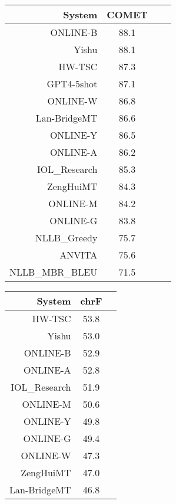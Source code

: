 \documentclass[11pt]{article}
\begin{document}
\begin{table}  
\scriptsize
\begin{subtable}[t]{0.33\textwidth}
\begin{tabular}{rccc}
\toprule 
System  & COMET \\ 
\midrule 
\rowcolor{ashgrey} ONLINE-B  & 88.1 \\ 
\rowcolor{ashgrey} Yishu  & 88.1 \\ 
HW-TSC  & 87.3 \\ 
\rowcolor{ashgrey} GPT4-5shot  & 87.1 \\ 
\rowcolor{ashgrey} ONLINE-W  & 86.8 \\ 
\rowcolor{ashgrey} Lan-BridgeMT  & 86.6 \\ 
\rowcolor{ashgrey} ONLINE-Y  & 86.5 \\ 
\rowcolor{ashgrey} ONLINE-A  & 86.2 \\ 
IOL\_Research  & 85.3 \\ 
\rowcolor{ashgrey} ZengHuiMT  & 84.3 \\ 
\rowcolor{ashgrey} ONLINE-M  & 84.2 \\ 
\rowcolor{ashgrey} ONLINE-G  & 83.8 \\ 
\rowcolor{ashgrey} NLLB\_Greedy  & 75.7 \\ 
ANVITA  & 75.6 \\ 
\rowcolor{ashgrey} NLLB\_MBR\_BLEU  & 71.5 \\ 
\bottomrule 
\end{tabular} 
\end{subtable}
\begin{subtable}[t]{0.33\textwidth}
\begin{tabular}{rcc}
\toprule 
System  & chrF \\ 
\midrule 
HW-TSC  & 53.8 \\ 
\rowcolor{ashgrey} Yishu  & 53.0 \\ 
\rowcolor{ashgrey} ONLINE-B  & 52.9 \\ 
\rowcolor{ashgrey} ONLINE-A  & 52.8 \\ 
IOL\_Research  & 51.9 \\ 
\rowcolor{ashgrey} ONLINE-M  & 50.6 \\ 
\rowcolor{ashgrey} ONLINE-Y  & 49.8 \\ 
\rowcolor{ashgrey} ONLINE-G  & 49.4 \\ 
\rowcolor{ashgrey} ONLINE-W  & 47.3 \\ 
\rowcolor{ashgrey} ZengHuiMT  & 47.0 \\ 
\rowcolor{ashgrey} Lan-BridgeMT  & 46.8 \\ 

\end{tabular}
\end{subtable}
\end{table}
\end{document}
